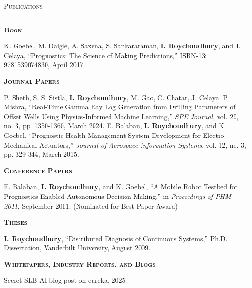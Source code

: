 \textsc{\Large{Publications}} %
\vspace{3pt}
\hrule

\begin{list}{}{\leftmargin=0in}

\item \textsc{\textbf{Book}}

\begin{list}{}{\leftmargin=0.3in}

 K. Goebel, M. Daigle, A. Saxena, S. Sankararaman, \textbf{I. Roychoudhury}, and J. Celaya, ``Prognostics: The Science of Making Predictions,'' ISBN-13: 9781539074830, April 2017.

\end{list}

\item \textsc{\textbf{Journal Papers}}

\begin{list}{}{\leftmargin=0.3in}

 P. Sheth, S. S. Sistla, \textbf{I. Roychoudhury}, M. Gao, C. Chatar, J. Celaya, P. Mishra, ``Real-Time Gamma Ray Log Generation from Drilling Parameters of Offset Wells Using Physics-Informed Machine Learning,'' \emph{SPE Journal}, vol. 29, no. 3, pp. 1350-1360, March 2024.
 E. Balaban, \textbf{I. Roychoudhury}, and K. Goebel,  ``Prognostic Health Management System Development for Electro-Mechanical Actuators,'' \emph{Journal of Aerospace Information Systems},  vol. 12, no. 3, pp. 329-344, March 2015.

\end{list}

\item \textsc{\textbf{Conference Papers}}

\begin{list}{}{\leftmargin=0.3in}
 E. Balaban, \textbf{I. Roychoudhury}, and K. Goebel, ``A Mobile Robot Testbed for Prognostics-Enabled Autonomous Decision Making,'' in \emph{Proceedings of PHM 2011}, September 2011. (Nominated for Best Paper Award)  %
\end{list}

\item \textsc{\textbf{Theses}}

\begin{itemize}
 \textbf{I. Roychoudhury}, ``Distributed Diagnosis of Continuous Systems,'' Ph.D. Dissertation, Vanderbilt University, August 2009.
\end{itemize}

\item \textsc{\textbf{Whitepapers\ifinternalcv, Industry Reports, and Blogs\fi}}

\begin{list}{}{\leftmargin=0.3in}
\begin{internalblock}
 Secret SLB AI blog post on eureka, 2025.
\end{internalblock}
\end{list}

\end{list}

